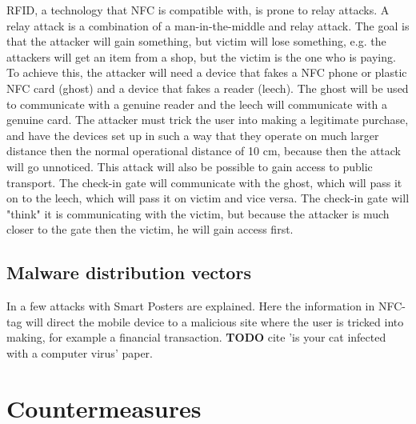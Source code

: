 RFID, a technology that NFC is compatible with, is prone to relay attacks. A relay attack is a combination of a man-in-the-middle and relay attack. The goal is that the attacker will gain something, but victim will lose something, e.g. the attackers will get an item from a shop, but the victim is the one who is paying. 
To achieve this, the attacker will need a device that fakes a NFC phone or plastic NFC card (ghost) and a device that fakes a reader (leech). The ghost will be used to communicate with a genuine reader and the leech will communicate with a genuine card. The attacker must trick the user into making a legitimate purchase, and have the devices set up in such a way that they operate on much larger distance then the normal operational distance of 10 cm, because then the attack will go unnoticed. \cite{1128470}
This attack will also be possible to gain access to public transport. The check-in gate will communicate with the ghost, which will pass it on to the leech, which will pass it on victim and vice versa. The check-in gate will "think" it is communicating with the victim, but because the attacker is much closer to the gate then the victim, he will gain access first.




\subsection{Malware distribution vectors}
In \cite{10.1109/ARES.2009.46} a few attacks with Smart Posters are explained.
Here the information in NFC-tag will direct the mobile device to a malicious site where the user is tricked into making, for example a financial transaction.
\textbf{TODO} cite 'is your cat infected with a computer virus' paper.

\section{Countermeasures}



